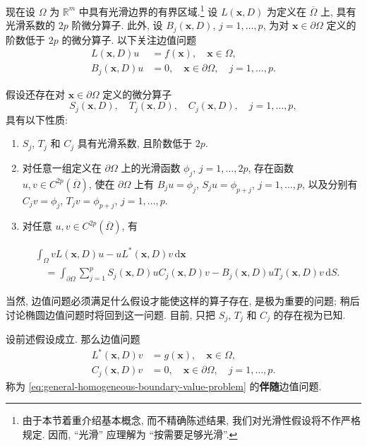 现在设 $\Omega$ 为 $\mathbb{R}^m$ 中具有光滑边界的有界区域.\footnote{由于本节着重介绍基本概念, 而不精确陈述结果, 我们对光滑性假设将不作严格规定. 因而, ``光滑'' 应理解为 ``按需要足够光滑''.} 设 $L(\bm{x},D)$ 为定义在 $\overline\Omega$ 上, 具有光滑系数的 $2p$ 阶微分算子. 此外, 设 $B_j(\bm{x},D)$, $j=1,\ldots,p$, 为对 $\bm{x}\in\partial\Omega$ 定义的阶数低于 $2p$ 的微分算子. 以下关注边值问题
\begin{equation}\label{eq:general-homogeneous-boundary-value-problem}
\begin{aligned}
L(\bm{x},D)u&=f(\bm{x}),\quad\bm{x}\in\Omega,\\
B_j(\bm{x},D)u&=0,\quad\bm{x}\in\partial\Omega,\quad j=1,\ldots,p.
\end{aligned}
\end{equation}


假设还存在对 $\bm{x}\in\partial\Omega$ 定义的微分算子 \[S_j(\bm{x},D),\quad T_j(\bm{x},D),\quad C_j(\bm{x},D),\quad j=1,\ldots,p,\] 具有以下性质:\begin{enumerate}
\item $S_j$, $T_j$ 和 $C_j$ 具有光滑系数, 且阶数低于 $2p$.
\item 对任意一组定义在 $\partial\Omega$ 上的光滑函数 $\phi_j$, $j=1,\ldots,2p$, 存在函数 $u,v\in C^{2p}(\overline\Omega)$, 使在 $\partial\Omega$ 上有 $B_ju=\phi_j$, $S_ju=\phi_{p+j}$, $j=1,\ldots,p$, 以及分别有 $C_jv=\phi_j$, $T_jv=\phi_{p+j}$, $j=1,\ldots,p$.
\item 对任意 $u,v\in C^{2p}(\overline\Omega)$, 有
\end{enumerate}
\begin{equation}\label{eq:general-boundary-operator-green-identity}
\begin{aligned}
&\int_\Omega vL(\bm{x},D)u-uL^*(\bm{x},D)v\,\mathrm{d}\bm{x}\\
&\quad=\int_{\partial\Omega}\sum_{j=1}^p S_j(\bm{x},D)uC_j(\bm{x},D)v
-B_j(\bm{x},D)uT_j(\bm{x},D)v\,\mathrm{d}S.
\end{aligned}
\end{equation}


当然, 边值问题必须满足什么假设才能使这样的算子存在, 是极为重要的问题; 稍后讨论椭圆边值问题时将回到这一问题. 目前, 只把 $S_j$, $T_j$ 和 $C_j$ 的存在视为已知.

\begin{Definition}
\label{def:adjoint-boundary-value-problem}
设前述假设成立. 那么边值问题
\begin{equation}\label{eq:general-adjoint-boundary-value-problem}
\begin{aligned}
L^*(\bm{x},D)v&=g(\bm{x}),\quad\bm{x}\in\Omega,\\
C_j(\bm{x},D)v&=0,\quad\bm{x}\in\partial\Omega,\quad j=1,\ldots,p.
\end{aligned}
\end{equation}
称为 \eqref{eq:general-homogeneous-boundary-value-problem} 的\textbf{伴随}边值问题.
\end{Definition}

